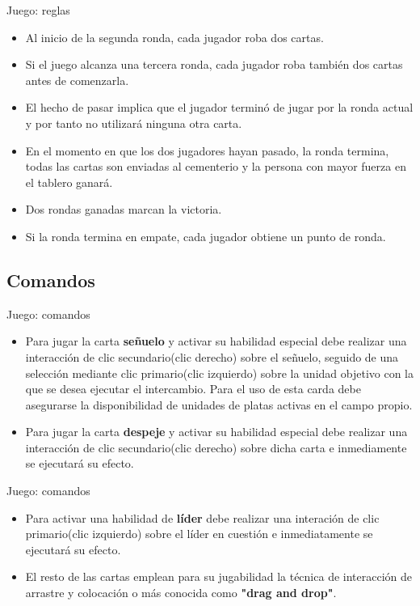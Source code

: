 \documentclass[a4paper, 12pt]{beamer}
\begin{document}
\begin{frame}{\textcolor{plata}{Juego: reglas}}
\begin{itemize}
\item Al inicio de la segunda ronda, cada jugador roba dos cartas.
\item Si el juego alcanza una tercera ronda, cada jugador roba también dos
cartas antes de comenzarla.
\item El hecho de pasar implica que el jugador terminó de jugar por la ronda actual y por tanto no utilizará ninguna otra carta.
\item En el momento en que los dos jugadores hayan pasado, la ronda termina, todas las cartas son enviadas al cementerio y la persona con mayor fuerza en el tablero ganará.
\item Dos rondas ganadas marcan la victoria.
\item Si la ronda termina en empate, cada jugador obtiene un punto de ronda.
\end{itemize}
\end{frame}

\subsection{Comandos}
\begin{frame}{\textcolor{plata}{Juego: comandos}}
\begin{itemize}
\item Para jugar la carta \textbf{señuelo} y activar su habilidad especial debe realizar una interacción de clic secundario(clic derecho) sobre el señuelo, seguido de una selección mediante clic primario(clic izquierdo) sobre la unidad objetivo con la que se desea ejecutar el intercambio. Para el uso de esta carda debe asegurarse la disponibilidad de unidades de platas activas en el campo propio.
\item Para jugar la carta \textbf{despeje} y activar su habilidad especial debe realizar una interacción de clic secundario(clic derecho) sobre dicha carta e inmediamente se ejecutará su efecto.
\end{itemize}
\end{frame}

\begin{frame}{\textcolor{plata}{Juego: comandos}}
\begin{itemize}
\item Para activar una habilidad de \textbf{líder} debe realizar una interación de clic primario(clic izquierdo) sobre el líder en cuestión e inmediatamente se ejecutará su efecto.
\item El resto de las cartas emplean para su jugabilidad la técnica de interacción de arrastre y colocación o más conocida como \textbf{"drag and drop"}.
\end{itemize}
\end{frame}
\end{document}
